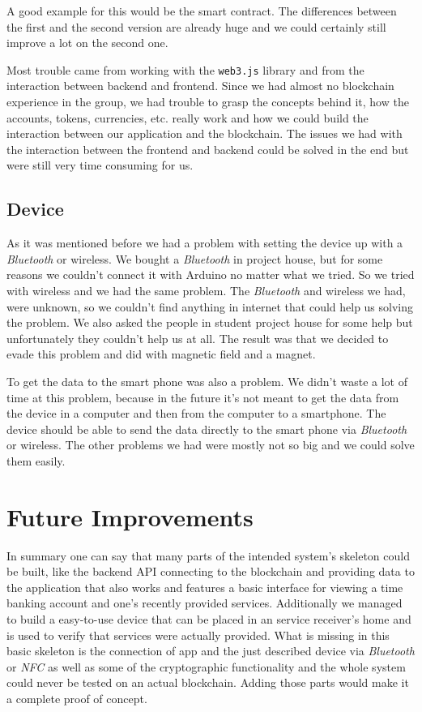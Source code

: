 \documentclass[12pt]{report}
\begin{document}
A good example for this would be the smart contract. The differences between the first and the second version are already huge and
we could certainly still improve a lot on the second one.

Most trouble came from working with the \texttt{web3.js} library and from the interaction between backend and frontend.
Since we had almost no blockchain experience in the group, we had trouble to grasp the concepts behind it, how the accounts, tokens, currencies, etc. really work and how we could build the interaction between our application and the blockchain.
The issues we had with the interaction between the frontend and backend could be solved in the end but were still very time consuming for us.

\subsection{Device}
As it was mentioned before we had a problem with setting the device up with a \emph{Bluetooth} or wireless. We bought a \emph{Bluetooth} in project house, but for some reasons we couldn't connect it with Arduino no matter what we tried. So we tried with wireless and we had the same problem. The \emph{Bluetooth} and wireless we had, were unknown, so we couldn't find anything in internet that could help us solving the problem. We also asked the people in student project house for some help but unfortunately they couldn't help us at all. The result was that we decided to evade this problem and did with magnetic field and a magnet.

To get the data to the smart phone was also a problem. We didn't waste a lot of time at this problem, because in the future it's not meant to get the data from the device in a computer and then from the computer to a smartphone. The device should be able to send the data directly to the smart phone via \emph{Bluetooth} or wireless.
The other problems we had were mostly not so big and we could solve them easily.


\newpage

\section{Future Improvements}
In summary one can say that many parts of the intended system's skeleton could be built, like the backend API connecting to the blockchain and providing data to the application that also works and features a basic interface for viewing a time banking account and one's recently provided services. Additionally we managed to build a easy-to-use device that can be placed in an service receiver's home and is used to verify that services were actually provided. What is missing in this basic skeleton is the connection of app and the just described device via \emph{Bluetooth} or \emph{NFC} as well as some of the cryptographic functionality and the whole system could never be tested on an actual blockchain. Adding those parts would make it a complete proof of concept.
\end{document}
